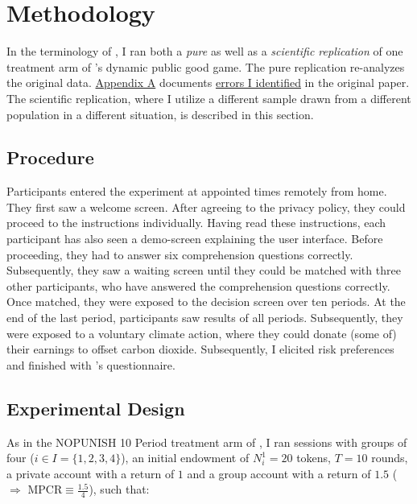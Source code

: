 \documentclass[
  authoryear,
  preprint,
  3p]{elsarticle}
\begin{document}
\hypertarget{methodology}{%
\section{Methodology}\label{methodology}}

In the terminology of \citet{Hamermesh2007}, I ran both a \emph{pure} as
well as a \emph{scientific replication} of one treatment arm of
\citet{GMTV2017}'s dynamic public good game. The pure replication
re-analyzes the original data.
\protect\hyperlink{A:-Pure-Replication}{Appendix A} documents
\href{}{errors I identified} in the original paper. The scientific
replication, where I utilize a different sample drawn from a different
population in a different situation, is described in this section.

\hypertarget{procedure}{%
\subsection{Procedure}\label{procedure}}

Participants entered the experiment at appointed times remotely from
home. They first saw a welcome screen. After agreeing to the privacy
policy, they could proceed to the instructions individually. Having read
these instructions, each participant has also seen a demo-screen
explaining the user interface. Before proceeding, they had to answer six
comprehension questions correctly. Subsequently, they saw a waiting
screen until they could be matched with three other participants, who
have answered the comprehension questions correctly. Once matched, they
were exposed to the decision screen over ten periods. At the end of the
last period, participants saw results of all periods. Subsequently, they
were exposed to a voluntary climate action, where they could donate
(some of) their earnings to offset carbon dioxide. Subsequently, I
elicited risk preferences \citep{HoltLaury2002} and finished with
\citet{GMTV2017}'s questionnaire.

\hypertarget{experimental-design}{%
\subsection{Experimental Design}\label{experimental-design}}

As in the NOPUNISH 10 Period treatment arm of \citet{GMTV2017}, I ran
sessions with groups of four (\(i \in I=\{1,2,3,4\}\)), an initial
endowment of \(N_i^1 = 20\) tokens, \(T=10\) rounds, a private account
with a return of \(1\) and a group account with a return of \(1.5\)
(\(\Rightarrow\) MPCR\(\equiv \frac{1.5}{4}\)), such that:
\end{document}
